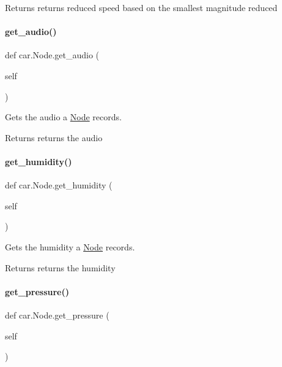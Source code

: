 \begin{DoxyReturn}{Returns}
returns reduced speed based on the smallest magnitude reduced 
\end{DoxyReturn}
\mbox{\label{classcar_1_1_node_ad2827b6d495c823e439ea9a2dc166641}} 
\paragraph{\texorpdfstring{get\_audio()}{get\_audio()}}
{\footnotesize\ttfamily def car.\+Node.\+get\+\_\+audio (\begin{DoxyParamCaption}\item[{}]{self }\end{DoxyParamCaption})}



Gets the audio a \mbox{\hyperlink{classcar_1_1_node}{Node}} records. 

\begin{DoxyReturn}{Returns}
returns the audio 
\end{DoxyReturn}
\mbox{\label{classcar_1_1_node_abde2366b1a2fdf09c41a05c96df5cb89}} 
\paragraph{\texorpdfstring{get\_humidity()}{get\_humidity()}}
{\footnotesize\ttfamily def car.\+Node.\+get\+\_\+humidity (\begin{DoxyParamCaption}\item[{}]{self }\end{DoxyParamCaption})}



Gets the humidity a \mbox{\hyperlink{classcar_1_1_node}{Node}} records. 

\begin{DoxyReturn}{Returns}
returns the humidity 
\end{DoxyReturn}
\mbox{\label{classcar_1_1_node_a15c2625783729c018f56e280f0574126}} 
\paragraph{\texorpdfstring{get\_pressure()}{get\_pressure()}}
{\footnotesize\ttfamily def car.\+Node.\+get\+\_\+pressure (\begin{DoxyParamCaption}\item[{}]{self }\end{DoxyParamCaption})}



